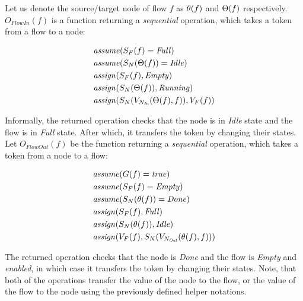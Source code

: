 \begin{definition}	
	Let us denote the source/target node of flow \(f\) as \( \theta(f) \) and \( \Theta(f) \) respectively. \(O_\mathit{FlowIn}(f)\) is a function returning a \emph{sequential} operation, which takes a token from a flow to a node:
	
	\begin{align*}
		&\mathit{assume}(S_F(f) = \mathit{Full}) \\
		&\mathit{assume}(S_N(\Theta(f)) = \mathit{Idle}) \\
		&\mathit{assign}(S_F(f), \mathit{Empty}) \\
		&\mathit{assign}(S_N(\Theta(f)), \mathit{Running}) \\
		&\mathit{assign}(S_N(V_{N_\mathit{In}}(\Theta(f), f)), V_F(f)) \\
	\end{align*}

	Informally, the returned operation checks that the node is in \emph{Idle} state and the flow is in \emph{Full} state. After which, it transfers the token by changing their states. Let \(O_\mathit{FlowOut}(f)\) be the function returning a \emph{sequential} operation, which takes a token from a node to a flow:
	
	\begin{align*}
		&\mathit{assume}(G(f) = \mathit{true}) \\
		&\mathit{assume}(S_F(f) = \mathit{Empty}) \\
		&\mathit{assume}(S_N(\theta(f)) = \mathit{Done}) \\
		&\mathit{assign}(S_F(f), \mathit{Full}) \\
		&\mathit{assign}(S_N(\theta(f)), \mathit{Idle}) \\
		&\mathit{assign}(V_F(f), S_N(V_{N_\mathit{Out}}(\theta(f), f))) \\
	\end{align*}

	The returned operation checks that the node is \emph{Done} and the flow is \emph{Empty} and \emph{enabled}, in which case it transfers the token by changing their states. Note, that both of the operations transfer the value of the node to the flow, or the value of the flow to the node using the previously defined helper notations.
\end{definition}

